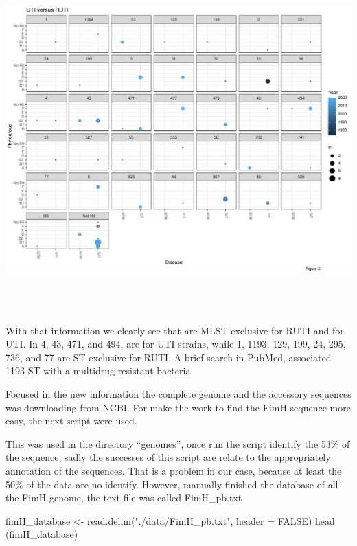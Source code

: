 \documentclass[
]{article}
\newenvironment{Shaded}{\begin{snugshade}}{\end{snugshade}}
\newcommand{\AttributeTok}[1]{\textcolor[rgb]{0.77,0.63,0.00}{#1}}
\newcommand{\ConstantTok}[1]{\textcolor[rgb]{0.00,0.00,0.00}{#1}}
\newcommand{\FunctionTok}[1]{\textcolor[rgb]{0.00,0.00,0.00}{#1}}
\newcommand{\NormalTok}[1]{#1}
\newcommand{\OtherTok}[1]{\textcolor[rgb]{0.56,0.35,0.01}{#1}}
\newcommand{\StringTok}[1]{\textcolor[rgb]{0.31,0.60,0.02}{#1}}
\begin{document}
\includegraphics[width=32.89583in,height=5.20833in]{images/Fig2.pdf}

With that information we clearly see that are MLST exclusive for RUTI
and for UTI. In 4, 43, 471, and 494, are for UTI strains, while 1, 1193,
129, 199, 24, 295, 736, and 77 are ST exclusive for RUTI. A brief search
in PubMed, associated 1193 ST with a multidrug resistant bacteria.

Focused in the new information the complete genome and the accessory
sequences was downloading from NCBI. For make the work to find the FimH
sequence more easy, the next script were used.

This was used in the directory ``genomes'', once run the script identify
the 53\% of the sequence, sadly the successes of this script are relate
to the appropriately annotation of the sequences. That is a problem in
our case, because at least the 50\% of the data are no identify.
However, manually finished the database of all the FimH genome, the text
file was called FimH\_pb.txt

\begin{Shaded}
\begin{Highlighting}[]
\NormalTok{fimH\_database }\OtherTok{\textless{}{-}} \FunctionTok{read.delim}\NormalTok{(}\StringTok{"./data/FimH\_pb.txt"}\NormalTok{, }\AttributeTok{header =} \ConstantTok{FALSE}\NormalTok{)}
\FunctionTok{head}\NormalTok{ (fimH\_database)}
\end{Highlighting}
\end{Shaded}
\end{document}
